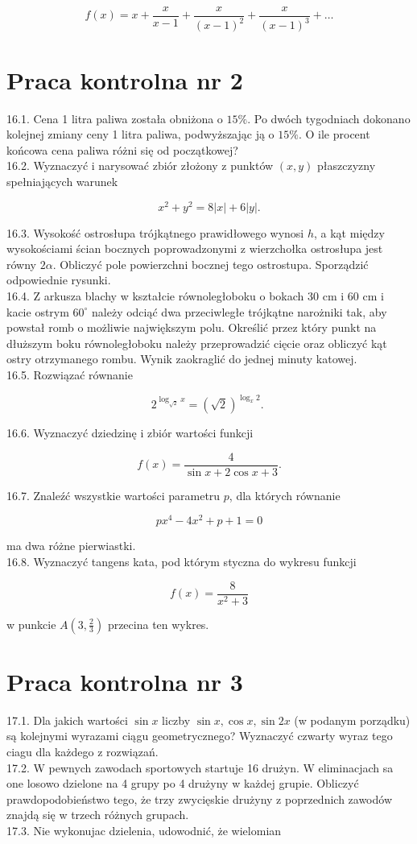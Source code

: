 \documentclass[10pt]{article}
\begin{document}
$$
f(x)=x+\frac{x}{x-1}+\frac{x}{(x-1)^{2}}+\frac{x}{(x-1)^{3}}+\ldots
$$

\section*{Praca kontrolna nr 2}
16.1. Cena 1 litra paliwa została obniżona o $15 \%$. Po dwóch tygodniach dokonano kolejnej zmiany ceny 1 litra paliwa, podwyższając ją o $15 \%$. O ile procent końcowa cena paliwa różni się od początkowej?\\
16.2. Wyznaczyć i narysować zbiór złożony z punktów $(x, y)$ płaszczyzny spełniających warunek

$$
x^{2}+y^{2}=8|x|+6|y| .
$$

16.3. Wysokość ostrosłupa trójkątnego prawidłowego wynosi $h$, a kąt między wysokościami ścian bocznych poprowadzonymi z wierzchołka ostrosłupa jest równy $2 \alpha$. Obliczyć pole powierzchni bocznej tego ostrostupa. Sporządzić odpowiednie rysunki.\\
16.4. Z arkusza blachy w kształcie równoległoboku o bokach 30 cm i 60 cm i kacie ostrym $60^{\circ}$ należy odciąć dwa przeciwległe trójkątne narożniki tak, aby powstał romb o możliwie największym polu. Określić przez który punkt na dłuższym boku równoległoboku należy przeprowadzić cięcie oraz obliczyć kąt ostry otrzymanego rombu. Wynik zaokraglić do jednej minuty katowej.\\
16.5. Rozwiązać równanie

$$
2^{\log _{\sqrt{2}} x}=(\sqrt{2})^{\log _{x} 2} \text {. }
$$

16.6. Wyznaczyć dziedzinę i zbiór wartości funkcji

$$
f(x)=\frac{4}{\sin x+2 \cos x+3} .
$$

16.7. Znaleźć wszystkie wartości parametru $p$, dla których równanie

$$
p x^{4}-4 x^{2}+p+1=0
$$

ma dwa różne pierwiastki.\\
16.8. Wyznaczyć tangens kata, pod którym styczna do wykresu funkcji

$$
f(x)=\frac{8}{x^{2}+3}
$$

w punkcie $A\left(3, \frac{2}{3}\right)$ przecina ten wykres.

\section*{Praca kontrolna nr 3}
17.1. Dla jakich wartości $\sin x$ liczby $\sin x, \cos x, \sin 2 x$ (w podanym porządku) są kolejnymi wyrazami ciągu geometrycznego? Wyznaczyć czwarty wyraz tego ciagu dla każdego z rozwiązań.\\
17.2. W pewnych zawodach sportowych startuje 16 drużyn. W eliminacjach sa one losowo dzielone na 4 grupy po 4 drużyny w każdej grupie. Obliczyć prawdopodobieństwo tego, że trzy zwycięskie drużyny z poprzednich zawodów znajdą się w trzech różnych grupach.\\
17.3. Nie wykonujac dzielenia, udowodnić, że wielomian
\end{document}
